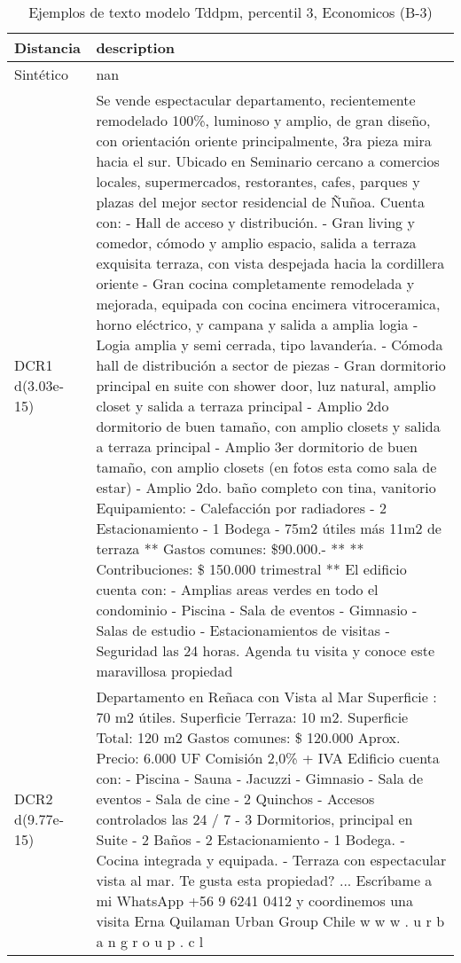 \begin{table}[H]
\centering
\fontsize{10}{14}\selectfont
\caption{Ejemplos de texto modelo Tddpm, percentil 3, Economicos (B-3)}
\label{table-example-economicos-b-3-tddpm_mlp-3p-text}
\begin{tabular}{|l|m{35em}|}
\hline
\rowcolor[gray]{0.8}
Distancia & description \\
\hline Sintético & nan \\
\hline DCR1 d(3.03e-15) & Se vende espectacular departamento, recientemente remodelado 100\%, luminoso y amplio, de gran dise\~no, con orientaci\'on oriente principalmente, 3ra pieza mira hacia el sur. Ubicado en Seminario cercano a comercios locales, supermercados, restorantes, cafes, parques y plazas del mejor sector residencial de \~Nu\~noa.  Cuenta con: - Hall de acceso y distribuci\'on. - Gran living y comedor, c\'omodo y amplio espacio, salida a terraza exquisita terraza, con vista despejada hacia la cordillera oriente - Gran cocina completamente remodelada y mejorada, equipada con cocina encimera vitroceramica, horno el\'ectrico, y campana y salida a amplia logia - Logia amplia y semi cerrada, tipo lavander{\'\i}a. - C\'omoda hall de distribuci\'on a sector de piezas - Gran dormitorio principal en suite con shower door, luz natural, amplio closet y salida a terraza principal - Amplio 2do dormitorio de buen tama\~no, con amplio closets y salida a terraza principal - Amplio 3er dormitorio de buen tama\~no, con amplio closets (en fotos esta como sala de estar)
 - Amplio 2do. ba\~no completo con tina, vanitorio   Equipamiento: - Calefacci\'on por radiadores - 2 Estacionamiento - 1 Bodega - 75m2 \'utiles m\'as 11m2 de terraza    ** Gastos comunes: \$90.000.- ** ** Contribuciones: \$ 150.000 trimestral **  El edificio cuenta con: - Amplias areas verdes en todo el condominio - Piscina - Sala de eventos - Gimnasio - Salas de estudio  - Estacionamientos de visitas - Seguridad las 24 horas.  Agenda tu visita y conoce este maravillosa propiedad \\
\hline DCR2 d(9.77e-15) & Departamento en Re\~naca con Vista al Mar   Superficie : 70 m2 \'utiles. Superficie Terraza: 10 m2. Superficie Total: 120 m2  Gastos comunes: \$ 120.000 Aprox.  Precio: 6.000 UF  Comisi\'on 2,0\% + IVA  Edificio cuenta con: - Piscina  - Sauna - Jacuzzi - Gimnasio  - Sala de eventos  - Sala de cine  - 2 Quinchos  - Accesos controlados las 24 / 7  - 3 Dormitorios, principal en Suite - 2 Ba\~nos  - 2 Estacionamiento - 1 Bodega. - Cocina integrada y equipada.  - Terraza con espectacular vista al mar.  Te gusta esta propiedad? ... Escr{\'\i}bame a mi WhatsApp +56 9 6241 0412 y coordinemos una visita  Erna Quilaman Urban Group Chile w w w . u r b a n g r o u p . c l \\
\hline
\end{tabular}
\end{table}
